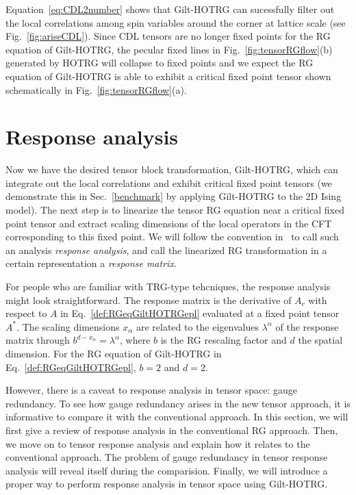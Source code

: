 \documentclass[aps,prb,reprint,superscriptaddress]{revtex4-2}
\begin{document}
Equation~\eqref{eq:CDL2number} shows that Gilt-HOTRG can sucessfully
filter out the local correlations among spin variables around the corner
at lattice scale (see Fig.~\ref{fig:ariseCDL}). Since CDL tensors are no
longer fixed points for the RG equation of Gilt-HOTRG, the pecular fixed
lines in Fig.~\ref{fig:tensorRGflow}(b) generated by HOTRG will collapse to
fixed points and we expect the RG equation of Gilt-HOTRG is able to
exhibit a critical fixed point tensor shown schematically in
Fig.~\ref{fig:tensorRGflow}(a).


\section{Response analysis\label{diffRGeq}}
Now we have the desired tensor block transformation, Gilt-HOTRG, which
can integrate out the local correlations and exhibit critical fixed
point tensors (we demonstrate this in Sec.~\ref{benchmark} by applying
Gilt-HOTRG to the 2D Ising model). The next step is to linearize the
tensor RG equation near a critical fixed point tensor and extract
scaling dimensions of the local operators in the CFT corresponding to
this fixed point. We will follow the convention in~\cite{kadanoff2014}
to call such an analysis \textit{response analysis}, and call the
linearized RG transformation in a certain representation
a \textit{response matrix}.
%

For people who are familiar with TRG-type tehcniques, the response
analysis might look straightforward. The response matrix is the
derivative of $A_c$ with respect to $A$ in
Eq.~\eqref{def:RGeqGiltHOTRGepl} evaluated at a fixed point tensor
$A^{*}$. The scaling dimensions $x_{\alpha}$ are related to the eigenvalues
$\lambda^{\alpha}$ of the response matrix through $b^{d-x_{\alpha}} =
\lambda^{\alpha}$, where $b$ is the RG rescaling factor and $d$ the
spatial dimension. For the RG equation of Gilt-HOTRG in
Eq.~\eqref{def:RGeqGiltHOTRGepl}, $b = 2$ and $d = 2$. 
%

However, there is a caveat to response analysis in tensor space: gauge
redundancy. To see how gauge redundancy arises in the new tensor
approach, it is informative to compare it with the conventional
approach. In this section, we will first give a review of response
analysis in the conventional RG approach. Then, we move on to tensor
response analysis and explain how it relates to the conventional
approach. The problem of gauge redundancy in tensor response analysis will
reveal itself during the comparision. Finally, we will introduce a
proper way to perform response analysis in tensor space using
Gilt-HOTRG.
%
\end{document}
